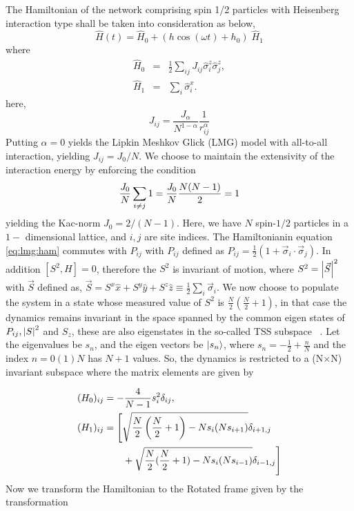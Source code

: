 \documentclass[%
reprint,
superscriptaddress,
amsmath,amssymb,
aps,
prb,
]{revtex4-2}
\begin{document}
	The Hamiltonian of the network comprising spin 1/2 particles with Heisenberg interaction type shall be taken into consideration as below,
	\begin{equation}
	\hat{H}(t) = \hat{H}_0 + \left(h \cos{(\omega t)} + h_0\right)\; \hat{H}_1
	\label{eq:lmg:ham}
	\end{equation}
	where
	\begin{eqnarray*}
		\hat{H}_0 &=& \frac12 \sum_{ij}J_{ij}\hat{\sigma}^z_i\hat{\sigma}^z_j,\\
		\hat{H}_1 &=& \sum_i\hat{\sigma}^x_i.
	\end{eqnarray*}
	here,
	\begin{equation*}
		J_{ij} =\frac{J_\alpha}{N^{1-\alpha}}\frac{1}{r_{ij}^{\alpha}}
	\end{equation*}
	Putting  $\alpha = 0$ yields the Lipkin Meshkov Glick (LMG) model with all-to-all interaction, yielding $J_{ij} = J_0/N$. We choose to maintain the extensivity of the interaction energy by enforcing the condition
	\begin{equation*}
		\frac{J_0}{N} \sum_{i\neq j}1=\frac{J_0}{N}\frac{N(N-1)}{2}=1\\
	\end{equation*}
	yielding the Kac-norm $J_0=2/(N-1)$. Here, we have $N$ spin-$1/2$ particles in a $1-$ dimensional lattice, and $i,j$ are site indices. The Hamiltonianin equation \ref{eq:lmg:ham} commutes with $P_{ij}$  with $P_{ij}$ defined as $P_{ij} = \displaystyle\frac{1}{2}(1+ \vec{\sigma}_i\cdot\vec{\sigma}_j)$. In addition $[S^2, H]=0$, therefore the $S^2$ is invariant of motion, where $S^2=\abs{\vec{S}}^2$ with $\vec{S}$ defined as, $ \vec{S}=S^x\hat{x}+S^y\hat{y}+S^z\hat{z}\equiv\frac12 \sum_i \vec{\sigma}_i$. We now choose to populate the system in a state whose  measured value of $S^2$ is $\displaystyle\frac{N}{2}\left(\frac{N}{2}+1\right)$, in that case the dynamics remains invariant in the space spanned by the common eigen states of $P_{ij}, \abs{S}^2$ and $S_z$, these are also eigenstates in the so-called TSS subspace ~\cite{mori_prethermalization_2019}. Let the eigenvalues be $s_n$, and the eigen vectors be $\ket{s_n}$, where $s_n=-\frac{1}{2}+\frac{n}{N}$ and the index
	$n= 0 (1) N$ has $N+1$ values. So, the dynamics is restricted to a (N$\times$N) invariant subspace where the matrix elements are given by 
	
	\begin{align}
		(H_0)_{ij} &= -\frac{4}{N-1} s^2_i \delta_{ij},\nonumber\\
		(H_1)_{ij} &= \Bigg[\sqrt{\frac{N}{2}\left(\frac{N}{2}+1\right) - Ns_i(Ns_{i + 1})}\delta_{i+1, j} \nonumber\\ 
		&\hskip 0.7cm +\sqrt{\frac{N}{2}(\frac{N}{2}+1) - Ns_i(Ns_{i- 1})}\delta_{i-1,j}\Bigg]
		\label{eq:lmg:tssham}
	\end{align}
	Now we transform the Hamiltonian to the Rotated frame given by the transformation
	
\end{document}
